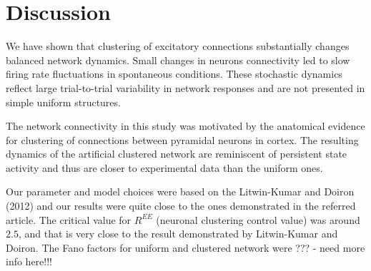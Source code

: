 \documentclass[11pt]{article}
\begin{document}

\section{Discussion}

We have shown that clustering of excitatory connections substantially changes balanced network dynamics. Small changes in neurons connectivity led to slow firing rate fluctuations in spontaneous conditions. These stochastic dynamics reflect large trial-to-trial variability in network responses and are not presented in simple uniform structures.

The network connectivity in this study was motivated by the anatomical evidence for clustering of connections between pyramidal neurons in cortex. The resulting dynamics of the artificial clustered network are reminiscent of persistent state activity and thus are closer to experimental data than the uniform ones.

Our parameter and model choices were based on the Litwin-Kumar and Doiron (2012) and our results were quite close to the ones demonstrated in the referred article. The critical value for $R^{EE}$ (neuronal clustering control value) was around $2.5$, and that is very close to the result demonstrated by Litwin-Kumar and Doiron. The Fano factors for uniform and clustered network were ??? - need more info here!!!
\end{document}
